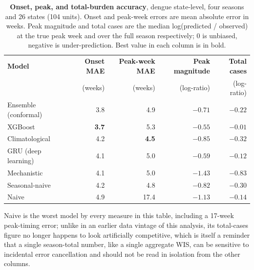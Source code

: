 \documentclass[11pt]{article}
\begin{document}
\begin{table}[t]
\centering\small
\caption{\textbf{Onset, peak, and total-burden accuracy}, dengue state-level, four seasons and 26
states (104 units). Onset and peak-week errors are mean absolute error in weeks. Peak magnitude and
total cases are the median log(predicted / observed) at the true peak week and over the full season
respectively; 0 is unbiased, negative is under-prediction. Best value in each column is in bold.}
\label{tab:operational}
\begin{tabular}{@{}lrrrr@{}}
\toprule
\textbf{Model} & \textbf{Onset MAE} & \textbf{Peak-week MAE} & \textbf{Peak magnitude} & \textbf{Total cases} \\
 & (weeks) & (weeks) & (log-ratio) & (log-ratio) \\
\midrule
Ensemble (conformal)   & 3.8 & 4.9 & $-0.71$ & $-0.22$ \\
XGBoost                & \textbf{3.7} & 5.3 & \textbf{$-0.55$} & \textbf{$-0.01$} \\
Climatological         & 4.2 & \textbf{4.5} & $-0.85$ & $-0.32$ \\
GRU (deep learning)    & 4.1 & 5.0 & $-0.59$ & $-0.12$ \\
Mechanistic            & 4.1 & 5.0 & $-1.43$ & $-0.83$ \\
Seasonal-naive         & 4.2 & 4.8 & $-0.82$ & $-0.30$ \\
Naive                  & 4.9 & 17.4 & $-1.13$ & $-0.14$ \\
\bottomrule
\end{tabular}

\smallskip
\footnotesize Naive is the worst model by every measure in this table, including a 17-week
peak-timing error; unlike in an earlier data vintage of this analysis, its total-cases figure no
longer happens to look artificially competitive, which is itself a reminder that a single
season-total number, like a single aggregate WIS, can be sensitive to incidental error cancellation
and should not be read in isolation from the other columns.
\end{table}
\end{document}
